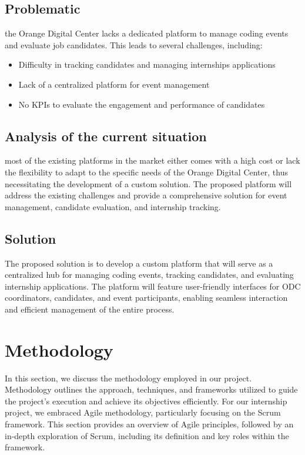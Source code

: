 \subsection{Problematic}
the Orange Digital Center lacks a dedicated platform to
manage coding events and evaluate job candidates. This leads to several
challenges, including:
\begin{itemize}
      \item Difficulty in tracking candidates and managing internships
            applications
      \item Lack of a centralized platform for event management
      \item No KPIs to evaluate the engagement and performance of candidates
\end{itemize}

\subsection{Analysis of the current situation}
most of the existing platforms in the market either comes with a high cost or
lack the flexibility to adapt to the specific needs of the Orange Digital
Center, thus
necessitating the development of a custom solution. The proposed platform will
address the existing challenges and provide a comprehensive solution for event
management, candidate evaluation, and internship tracking.

\subsection{Solution}
The proposed solution is to develop a custom platform that will serve as a
centralized hub for managing coding events, tracking candidates, and evaluating
internship applications. The platform will feature user-friendly interfaces for
ODC coordinators, candidates, and event participants, enabling seamless
interaction and efficient management of the entire process.

\section{Methodology}
In this section, we discuss the methodology employed in our project.
Methodology outlines the approach, techniques, and frameworks utilized to guide
the project's execution and achieve its objectives efficiently. For our
internship project, we embraced Agile methodology, particularly focusing on the
Scrum framework. This section provides an overview of Agile principles,
followed by an in-depth exploration of Scrum, including its definition and key
roles within the framework.

